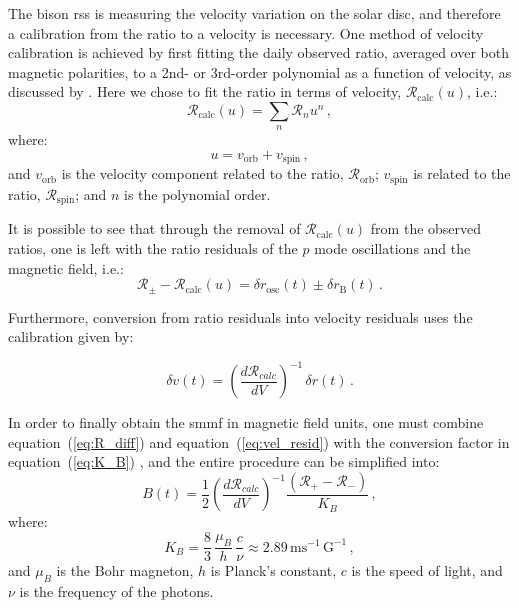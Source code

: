 The \gls{bison} \gls{rss} is measuring the velocity variation on the solar disc, and therefore a calibration from the ratio to a velocity is necessary. One method of velocity calibration is achieved by first fitting the daily observed ratio, averaged over both magnetic polarities, to a 2nd- or 3rd-order polynomial as a function of velocity, as discussed by \citet{elsworth_techniques_1995}. Here we chose to fit the ratio in terms of velocity, $\mathcal{R}_{\mathrm{calc}}(u)$, i.e.:
%
\begin{equation}
\mathcal{R}_{\mathrm{calc}}(u) = \sum_{n} \mathcal{R}_{n} u^n \, ,
\label{eq:calc_ratio}
\end{equation}
%
where:
%
\begin{equation}
u = v_{\mathrm{orb}} + v_{\mathrm{spin}} \, ,
\label{eq:stn_vel}
\end{equation}
%
and $v_{\mathrm{orb}}$ is the velocity component related to the ratio,  $\mathcal{R}_{\mathrm{orb}}$; $v_{\mathrm{spin}}$ is related to the ratio, $\mathcal{R}_{\mathrm{spin}}$; and $n$ is the polynomial order.

It is possible to see that through the removal of $\mathcal{R}_{\mathrm{calc}}(u)$ from the observed ratios, one is left with the ratio residuals of the $p$ mode oscillations and the magnetic field, i.e.:
%
\begin{equation}
\mathcal{R}_{\pm} - \mathcal{R}_{\mathrm{calc}}(u) = \delta {r}_{\mathrm{osc}}(t) \pm \delta {r}_{\mathrm{B}}(t)
\label{eq:ratio_resid} \, .
\end{equation}

Furthermore, conversion from ratio residuals into velocity residuals uses the calibration given by:

\begin{equation}
\delta v(t) = \left( \frac{d\mathcal{R}_{calc}}{dV} \right)^{-1} \, \delta {r}(t) \, .
\label{eq:vel_resid}
\end{equation}

In order to finally obtain the \gls{smmf} in magnetic field units, one must combine equation~(\ref{eq:R_diff}) and  equation~(\ref{eq:vel_resid}) with the conversion factor in equation~(\ref{eq:K_B}) \citep{dumbill_observation_1999}, and the entire procedure can be simplified into:
%
\begin{equation}
B(t) = \frac{1}{2} \left( \frac{d\mathcal{R}_{calc}}{dV} \right)^{-1} \frac{(\mathcal{R}_{+} - \mathcal{R}_{-})}{K_B} \, ,
\label{eq:simplified_SMMF_cal}
\end{equation}
%
where:
%
\begin{equation}
K_B = \frac{8}{3} \, \frac{\mu_B}{h} \, \frac{c}{\nu} \approx 2.89 \, \mathrm{ms}^{-1} \, \mathrm{G}^{-1} \, ,
\label{eq:K_B}
\end{equation}
%
and $\mu_B$ is the Bohr magneton, $h$ is Planck's constant, $c$ is the speed of light, and $\nu$ is the frequency of the photons.

